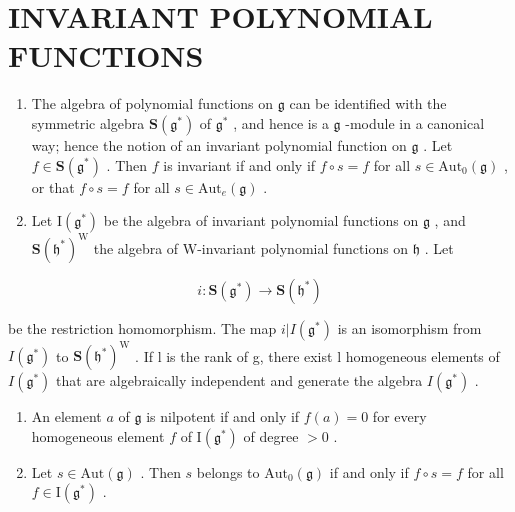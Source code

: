 \section*{INVARIANT POLYNOMIAL FUNCTIONS}

\begin{enumerate}
\def\labelenumi{\arabic{enumi})}
\setcounter{enumi}{28}
\item
  The algebra of polynomial functions on \(\mathfrak{g}\) can be identified with the symmetric algebra \(\mathbf{S}(\mathfrak{g}^*)\) of \(\mathfrak{g}^*\) , and hence is a \(\mathfrak{g}\) -module in a canonical way; hence the notion of an invariant polynomial function on \(\mathfrak{g}\) . Let \(f \in \mathbf{S}(\mathfrak{g}^*)\) . Then \(f\) is invariant if and only if \(f \circ s = f\) for all \(s \in \mathrm{Aut}_0(\mathfrak{g})\) , or that \(f \circ s = f\) for all \(s \in \mathrm{Aut}_e(\mathfrak{g})\) .
\item
  Let \(\mathrm{I}(\mathfrak{g}^*)\) be the algebra of invariant polynomial functions on \(\mathfrak{g}\) , and \(\mathbf{S}(\mathfrak{h}^*)^{\mathrm{W}}\) the algebra of W-invariant polynomial functions on \(\mathfrak{h}\) . Let
\end{enumerate}

\[
i: \mathbf {S} (\mathfrak {g} ^ {*}) \to \mathbf {S} (\mathfrak {h} ^ {*})
\]

be the restriction homomorphism. The map \(i|I(\mathfrak{g}^{*})\) is an isomorphism from \(I(\mathfrak{g}^{*})\) to \(\mathbf{S}(\mathfrak{h}^{*})^{\mathrm{W}}\) . If l is the rank of g, there exist l homogeneous elements of \(I(\mathfrak{g}^{*})\) that are algebraically independent and generate the algebra \(I(\mathfrak{g}^{*})\) .

\begin{enumerate}
\def\labelenumi{\arabic{enumi})}
\setcounter{enumi}{30}
\item
  An element \(a\) of \(\mathfrak{g}\) is nilpotent if and only if \(f(a) = 0\) for every homogeneous element \(f\) of \(\mathrm{I}(\mathfrak{g}^*)\) of degree \(> 0\) .
\item
  Let \(s \in \mathrm{Aut}(\mathfrak{g})\) . Then \(s\) belongs to \(\mathrm{Aut}_0(\mathfrak{g})\) if and only if \(f \circ s = f\) for all \(f \in \mathrm{I}(\mathfrak{g}^*)\) .
\end{enumerate}

